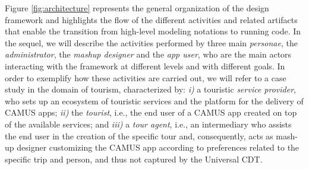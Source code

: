Figure \ref{fig:architecture} represents the general organization of the design framework and highlights the flow of the different activities and related artifacts that enable the transition from high-level modeling notations to running code. In the sequel, we will describe the activities performed by three main \emph{personae}, the \emph{administrator}, the \emph{mashup designer } and the \emph{app user}, who are the main actors interacting with the framework at different levels and with different goals. In order to exemplify how these activities are carried out, we will refer to a case study in the domain of tourism, characterized by: \emph{i)} a touristic \emph{service provider}, who sets up an ecosystem of touristic services and the platform for the delivery of CAMUS apps; \emph{ii) } the \emph{tourist}, i.e., the end user of a CAMUS app created on top of the available services; and \emph{iii) }a \emph{tour agent}, i.e., an intermediary 
who assists the end user in the creation of the specific tour and, consequently, acts as mash-up designer customizing the CAMUS app according to preferences related to the specific trip and person, and thus not captured by the Universal CDT.     

